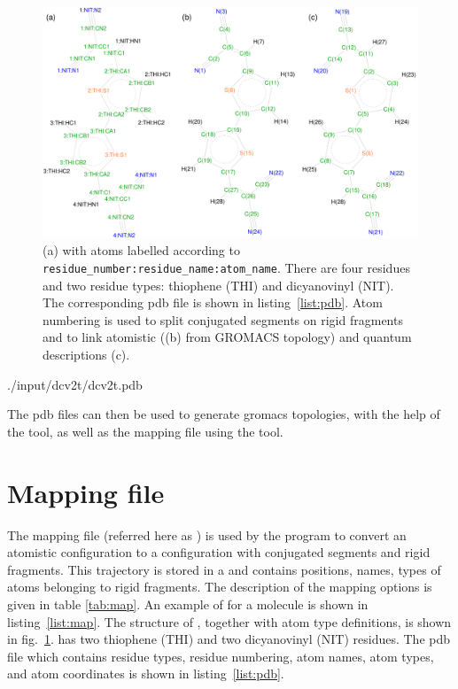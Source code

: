\begin{figure}[ht]
\centering
\includegraphics[width=\textwidth]{./fig/dcv2t}
\caption{\small (a) \dcvt with atoms labelled according to \texttt{residue\_number:residue\_name:atom\_name}. 
There are four residues and two residue types: thiophene (THI) and dicyanovinyl (NIT). The corresponding pdb file is shown in listing~\ref{list:pdb}. Atom numbering is used to split conjugated segments on rigid fragments and to link atomistic ((b) from GROMACS topology) and quantum descriptions (c).}
\label{fig:dcv2t}
\end{figure}

%
{./input/dcv2t/dcv2t.pdb}

The pdb files can then be used to generate gromacs topologies, with the help of the  tool,  as well as the mapping file using  the tool. 

\section{Mapping file}
\label{sec:xmlmap}
The mapping file (referred here as \xmlcsg) is used by the program \ctpmap to convert an atomistic configuration to a configuration with conjugated segments and rigid fragments. This trajectory is stored in a  and contains positions, names, types of atoms belonging to rigid fragments. The description of the mapping options is given in table \ref{tab:map}. An example of \xmlcsg for a \dcvt molecule is shown in listing~\ref{list:map}.  The structure of \dcvt, together with atom type definitions, is shown in fig.~\ref{fig:dcv2t}. \dcvt has two thiophene (THI) and two dicyanovinyl (NIT) residues. The pdb file which contains residue types, residue numbering, atom names, atom types, and atom coordinates is shown in listing~\ref{list:pdb}.

